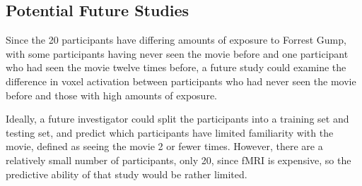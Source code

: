 \documentclass[11pt]{article}
\begin{document}
\subsection{Potential Future Studies}

Since the 20 participants have differing
amounts of exposure to Forrest Gump, with some participants having never seen
the movie before and one participant who had seen the movie twelve times
before, a future study could examine the difference in voxel activation
between participants who had never seen the movie before and those with high
amounts of exposure.

Ideally, a future investigator could split the participants into a training
set and testing set, and predict which participants have limited familiarity
with the movie, defined as seeing the movie 2 or fewer times.  However, there
are a relatively small number of participants, only 20, since fMRI is
expensive, so the predictive ability of that study would be rather limited.



\end{document}

